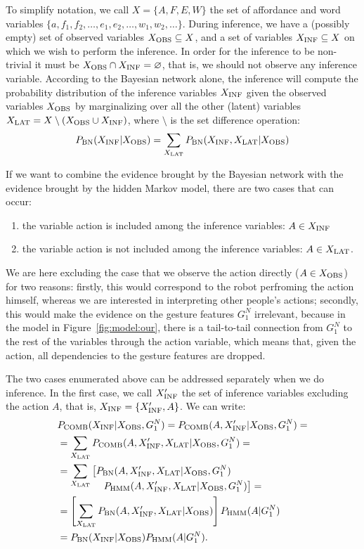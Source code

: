 To simplify notation, we call $X = \{A, F, E, W\}$ the set of affordance and word variables $\{a, f_1, f_2, \dots, e_1, e_2, \dots, w_1, w_2, \dots\}$.
During inference, we have a (possibly empty) set of observed variables $X_\text{OBS} \subseteq X$, and a set of variables $X_\text{INF} \subseteq X$ on which we wish to perform the inference.
In order for the inference to be non-trivial it must be $X_\text{OBS} \cap X_\text{INF} = \varnothing$, that is, we should not observe any inference variable.
According to the Bayesian network alone, the inference will compute the probability distribution of the inference variables $X_\text{INF}$ given the observed variables $X_\text{OBS}$ by marginalizing over all the other (latent) variables $X_\text{LAT} = X \setminus (X_\text{OBS} \cup X_\text{INF})$, where $\setminus$ is the set difference operation:
\begin{eqnarray*}
 P_{\text{BN}}(X_\text{INF}|X_\text{OBS}) = \sum_{X_\text{LAT}} P_{\text{BN}}(X_\text{INF}, X_\text{LAT}| X_\text{OBS})
\end{eqnarray*}

If we want to combine the evidence brought by the Bayesian network with the evidence brought by the hidden Markov model, there are two cases that can occur:
\begin{enumerate}
\item the variable action is included among the inference variables: $A \in X_\text{INF}$
\item the variable action is not included among the inference variables: $A \in X_\text{LAT}$.
\end{enumerate}
We are here excluding the case that we observe the action directly ($A\in X_\text{OBS}$) for two reasons: firstly, this would correspond to the robot perfroming the action himself, whereas we are interested in interpreting other people's actions;
secondly, this would make the evidence on the gesture features $G_1^N$ irrelevant, because in the model in Figure~\ref{fig:model:our}, there is a tail-to-tail connection from $G_1^N$ to the rest of the variables through the action variable, which means that, given the action, all dependencies to the gesture features are dropped. 

The two cases enumerated above can be addressed separately when we do inference.
In the first case, we call $X_\text{INF}^\prime$ the set of inference variables excluding the action $A$, that is, $X_\text{INF} = \{X_\text{INF}^\prime, A\}$.
We can write:
\begin{align*}
  & P_\text{COMB}(X_\text{INF}| X_\text{OBS}, G_1^N) = P_\text{COMB}(A, X_\text{INF}^\prime| X_\text{OBS}, G_1^N)= \\
  &= \sum_{X_\text{LAT}} P_\text{COMB}(A, X_\text{INF}^\prime, X_\text{LAT}| X_\text{OBS}, G_1^N)=\\
  &= \sum_{X_\text{LAT}} \left[P_{\text{BN}}(A, X_\text{INF}^\prime, X_\text{LAT}| X_\text{OBS}, G_1^N)\right. \\[-4mm]
    & \mspace{80mu} \left.P_{\text{HMM}}(A, X_\text{INF}^\prime, X_\text{LAT}| X_\text{OBS}, G_1^N)\right]= \\
  &= \left[\sum_{X_\text{LAT}} P_{\text{BN}}(A, X_\text{INF}^\prime, X_\text{LAT}| X_\text{OBS})\right] P_{\text{HMM}}(A | G_1^N) \\
  &= P_{\text{BN}}(X_\text{INF}| X_\text{OBS}) P_{\text{HMM}}(A | G_1^N).
\end{align*}

